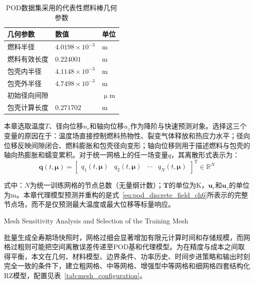 \begin{table}[htbp]
	\centering
	\caption{POD数据集采用的代表性燃料棒几何参数}
	\label{tab:pod_geometry}
	\begin{tabularx}{\textwidth}
		{>{\centering\arraybackslash}X
			>{\centering\arraybackslash}p{3.0cm}
			>{\centering\arraybackslash}p{3.0cm}}
		\toprule
		几何参数 & 数值 & 单位 \\
		\midrule
		燃料半径 & $4.0198\times10^{-3}$ & $\mathrm{m}$ \\
		燃料有效长度 & $0.224001$ & $\mathrm{m}$ \\
		包壳内半径 & $4.1148\times10^{-3}$ & $\mathrm{m}$ \\
		包壳外半径 & $4.7498\times10^{-3}$ & $\mathrm{m}$ \\
		初始径向间隙 & 95 & $\upmu\mathrm{m}$ \\
		包壳计算长度 & $0.271702$ & $\mathrm{m}$ \\
		\bottomrule
	\end{tabularx}
\end{table}

本章选取温度$T$、径向位移$u_r$和轴向位移$u_z$作为降阶与快速预测对象。选择这三个变量的原因在于：温度场直接控制燃料热物性、裂变气体释放和热应力水平；径向位移反映间隙闭合、燃料膨胀和包壳径向变形；轴向位移则用于描述燃料与包壳的轴向热膨胀和蠕变累积。对于统一网格上的任一场变量$q$，其离散形式表示为：
\begin{equation}
	\boldsymbol{q}(t,\boldsymbol{\mu})
	=
	\begin{bmatrix}
		q_1(t,\boldsymbol{\mu}) &
		q_2(t,\boldsymbol{\mu}) &
		\cdots &
		q_N(t,\boldsymbol{\mu})
	\end{bmatrix}^{\mathrm T}
	\in\mathbb{R}^{N}
	\label{eq:pod_discrete_field_ch6}
\end{equation}

\noindent 式中：$N$为统一训练网格的节点总数（无量纲计数）；$\boldsymbol T$的单位为$\mathrm{K}$，$\boldsymbol u_r$和$\boldsymbol u_z$的单位为$\mathrm{m}$。本章代理模型预测并重构的是式~\eqref{eq:pod_discrete_field_ch6}所表示的完整节点场，而不是仅预测最大温度或最大位移等标量响应。

{Mesh Sensitivity Analysis and Selection of the Training Mesh}

批量生成全寿期场快照时，网格过细会显著增加有限元计算时间和存储规模，而网格过粗则可能把空间离散误差传递至POD基和代理模型。为在精度与成本之间取得平衡，本文在几何、材料模型、边界条件、功率历史、时间步进策略和输出时刻完全一致的条件下，建立粗网格、中等网格、增强型中等网格和细网格四套结构化RZ模型，配置见表~\ref{tab:mesh_configuration}。

